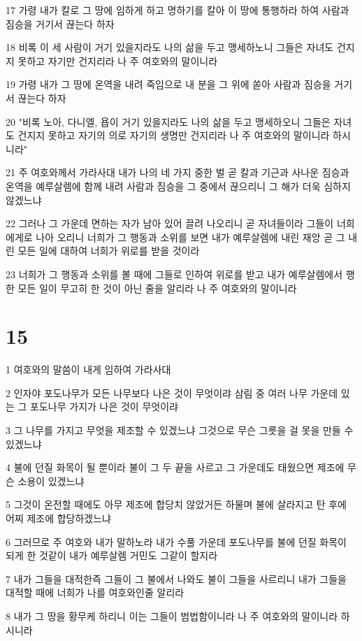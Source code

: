 \par 17 가령 내가 칼로 그 땅에 임하게 하고 명하기를 칼아 이 땅에 통행하라 하여 사람과 짐승을 거기서 끊는다 하자
\par 18 비록 이 세 사람이 거기 있을지라도 나의 삶을 두고 맹세하노니 그들은 자녀도 건지지 못하고 자기만 건지리라 나 주 여호와의 말이니라
\par 19 가령 내가 그 땅에 온역을 내려 죽임으로 내 분을 그 위에 쏟아 사람과 짐승을 거기서 끊는다 하자
\par 20 "비록 노아, 다니엘, 욥이 거기 있을지라도 나의 삶을 두고 맹세하오니 그들은 자녀도 건지지 못하고 자기의 의로 자기의 생명만 건지리라 나 주 여호와의 말이니라 하시니라"
\par 21 주 여호와께서 가라사대 내가 나의 네 가지 중한 벌 곧 칼과 기근과 사나운 짐승과 온역을 예루살렘에 함께 내려 사람과 짐승을 그 중에서 끊으리니 그 해가 더욱 심하지 않겠느냐
\par 22 그러나 그 가운데 면하는 자가 남아 있어 끌려 나오리니 곧 자녀들이라 그들이 너희에게로 나아 오리니 너희가 그 행동과 소위를 보면 내가 예루살렘에 내린 재앙 곧 그 내린 모든 일에 대하여 너희가 위로를 받을 것이라
\par 23 너희가 그 행동과 소위를 볼 때에 그들로 인하여 위로를 받고 내가 예루살렘에서 행한 모든 일이 무고히 한 것이 아닌 줄을 알리라 나 주 여호와의 말이니라

\chapter{15}

\par 1 여호와의 말씀이 내게 임하여 가라사대
\par 2 인자야 포도나무가 모든 나무보다 나은 것이 무엇이랴 삼림 중 여러 나무 가운데 있는 그 포도나무 가지가 나은 것이 무엇이랴
\par 3 그 나무를 가지고 무엇을 제조할 수 있겠느냐 그것으로 무슨 그릇을 걸 못을 만들 수 있겠느냐
\par 4 불에 던질 화목이 될 뿐이라 불이 그 두 끝을 사르고 그 가운데도 태웠으면 제조에 무슨 소용이 있겠느냐
\par 5 그것이 온전할 때에도 아무 제조에 합당치 않았거든 하물며 불에 살라지고 탄 후에 어찌 제조에 합당하겠느냐
\par 6 그러므로 주 여호와 내가 말하노라 내가 수풀 가운데 포도나무를 불에 던질 화목이 되게 한 것같이 내가 예루살렘 거민도 그같이 할지라
\par 7 내가 그들을 대적한즉 그들이 그 불에서 나와도 불이 그들을 사르리니 내가 그들을 대적할 때에 너희가 나를 여호와인줄 알리라
\par 8 내가 그 땅을 황무케 하리니 이는 그들이 범법함이니라 나 주 여호와의 말이니라 하시니라

